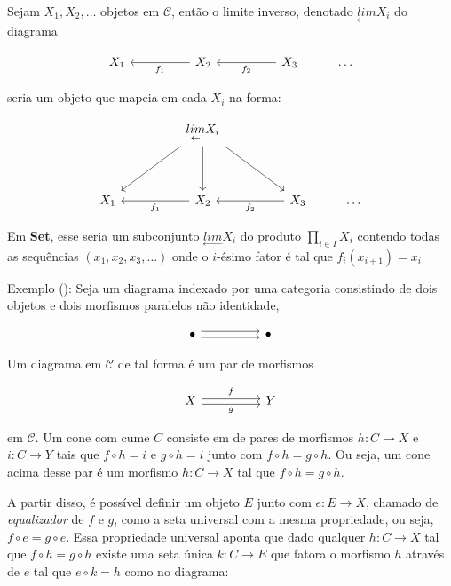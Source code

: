 \documentclass[../main.tex]{subfiles}
\begin{document}
Sejam $X_1, X_2, \dots$ objetos em $\mathcal{C}$, então o limite inverso, denotado $\underset{\leftarrow}{lim} X_i$ do diagrama 

\[\begin{tikzcd}
	{X_1} && {X_2} && {X_3} & \dots
	\arrow["{f_1}", from=1-3, to=1-1]
	\arrow["{f_2}", from=1-5, to=1-3]
\end{tikzcd}\]

seria um objeto que mapeia em cada $X_i$ na forma:

\[\begin{tikzcd}
	&& {\underset{\leftarrow}{lim} X_i} \\
	\\
	{X_1} && {X_2} && {X_3} & \dots
	\arrow[from=1-3, to=3-1]
	\arrow[from=1-3, to=3-3]
	\arrow[from=1-3, to=3-5]
	\arrow["{f_1}", from=3-3, to=3-1]
	\arrow["{f_2}", from=3-5, to=3-3]
\end{tikzcd}\]

Em \textbf{Set}, esse seria um subconjunto $\underset{\leftarrow}{lim} X_i$ do produto $\prod_{i \in I} X_i$ contendo todas as sequências $(x_1, x_2, x_3, \dots)
$ onde o $i$-ésimo fator é tal que $f_i (x_{i+1}) = x_i$

Exemplo (\cite{rosiak2022}): Seja um diagrama indexado por uma categoria consistindo de dois objetos e dois morfismos paralelos não identidade,

\[\begin{tikzcd}
	\bullet && \bullet
	\arrow[shift right, from=1-1, to=1-3]
	\arrow[shift left, from=1-1, to=1-3]
\end{tikzcd}\]

Um diagrama em $\mathcal{C}$ de tal forma é um par de morfismos

\[\begin{tikzcd}
	X && Y
	\arrow["g"', shift right, from=1-1, to=1-3]
	\arrow["f", shift left, from=1-1, to=1-3]
\end{tikzcd}\]

em $\mathcal{C}$. Um cone com cume $C$ consiste em de pares de morfismos $h : C \to X$ e $i : C \to Y$ tais que $f \circ h = i$ e $g \circ h = i$ junto com $f \circ h = g \circ h$. Ou seja, um cone acima desse par é um morfismo $h : C \to X$ tal que $f \circ h = g \circ h$. 

A partir disso, é possível definir um objeto $E$ junto com $e : E \to X$, chamado de \emph{equalizador} de $f$ e $g$, como a seta universal com a mesma propriedade, ou seja, $f \circ e = g \circ e$. Essa propriedade universal aponta que dado qualquer $h : C \to X$ tal que $f \circ h = g \circ h$ existe uma seta única $k : C \to E$ que fatora o morfismo $h$ através de $e$ tal que $e \circ k = h$ como no diagrama:
\end{document}
